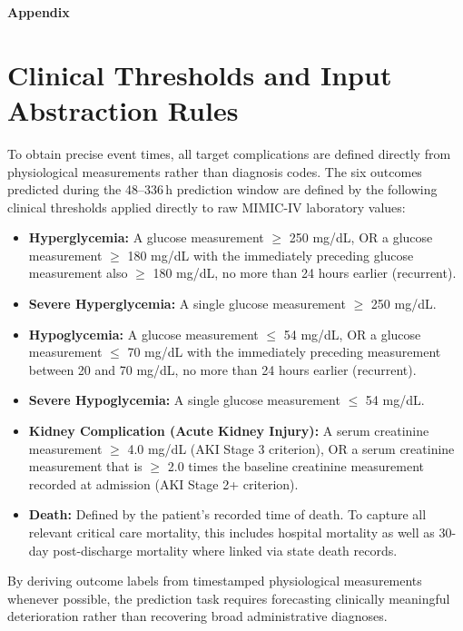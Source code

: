 \appendix
\setcounter{secnumdepth}{2}


\begin{center}
  \Large\textbf{Appendix}
\end{center}

\section{Clinical Thresholds and Input Abstraction Rules}
\label{app:clinical-thresholds}

To obtain precise event times, all target complications are defined directly from physiological measurements rather than diagnosis codes. The six outcomes predicted during the 48--336\,h prediction window are defined by the following clinical thresholds applied directly to raw MIMIC-IV laboratory values:

\begin{itemize}
    \item \textbf{Hyperglycemia:} A glucose measurement $\ge$ 250 mg/dL, OR a glucose measurement $\ge$ 180 mg/dL with the immediately preceding glucose measurement also $\ge$ 180 mg/dL, no more than 24 hours earlier (recurrent).
    \item \textbf{Severe Hyperglycemia:} A single glucose measurement $\ge$ 250 mg/dL.
    \item \textbf{Hypoglycemia:} A glucose measurement $\le$ 54 mg/dL, OR a glucose measurement $\le$ 70 mg/dL with the immediately preceding measurement between 20 and 70 mg/dL, no more than 24 hours earlier (recurrent).
    \item \textbf{Severe Hypoglycemia:} A single glucose measurement $\le$ 54 mg/dL.
    \item \textbf{Kidney Complication (Acute Kidney Injury):} A serum creatinine measurement $\ge$ 4.0 mg/dL (AKI Stage 3 criterion), OR a serum creatinine measurement that is $\ge$ 2.0 times the baseline creatinine measurement recorded at admission (AKI Stage 2+ criterion).
    \item \textbf{Death:} Defined by the patient's recorded time of death. To capture all relevant critical care mortality, this includes hospital mortality as well as 30-day post-discharge mortality where linked via state death records.
\end{itemize}

By deriving outcome labels from timestamped physiological measurements whenever possible, the prediction task requires forecasting clinically meaningful deterioration rather than recovering broad administrative diagnoses.

